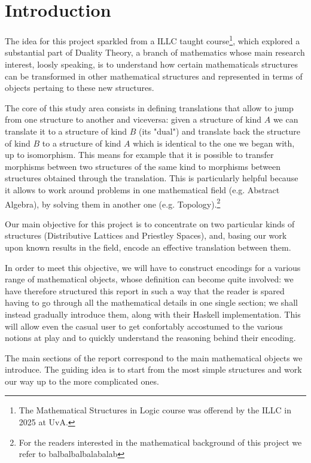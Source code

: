 \documentclass[12pt,a4paper]{article}
\begin{document}
\section{Introduction}

The idea for this project sparkled from a ILLC taught course\footnote{The Mathematical Structures in Logic course was offerend by the ILLC in 2025 at UvA.}, which explored a substantial part of Duality Theory, a branch of mathematics whose main research interest, loosly speaking, is to understand how certain mathematicals structures can be  transformed in other mathematical structures and represented in terms of objects pertaing to these new structures. 

The core of this study area consists in defining translations that allow to jump from one structure to another and viceversa: given a structure of kind $A$ we can translate it to a structure of kind $B$ (its "dual") and translate back the structure of kind $B$ to a structure of kind $A$ which is identical to the one we began with, up to isomorphism. This means for example that it is possible to transfer morphisms between two structures of the same kind to morphisms between structures obtained through the translation. This is particularly helpful because it allows to work around problems in one mathematical field  (e.g. Abstract Algebra), by solving them in another one (e.g. Topology).\footnote{For the readers interested in the mathematical background of this project we refer to balbalbalbalabalab}

Our main objective for this project is to concentrate on two particular kinds of structures (Distributive Lattices and Priestley Spaces), and, basing our work upon known results in the field, encode an effective translation between them.

In order to meet this objective, we will have to construct encodings for a various range of mathematical objects, whose definition can become quite involved: we have therefore structured this report in such a way that the reader is spared having to go through all the mathematical details in one single section; we shall instead gradually introduce them, along with their Haskell implementation. This will allow even the casual user to get confortably accostumed to the various notions at play and to quickly understand the reasoning behind their encoding.

The main sections of the report correspond to the main mathematical objects we introduce. The guiding idea is to start from the most simple structures and work our way up to the more complicated ones. 
\end{document}
